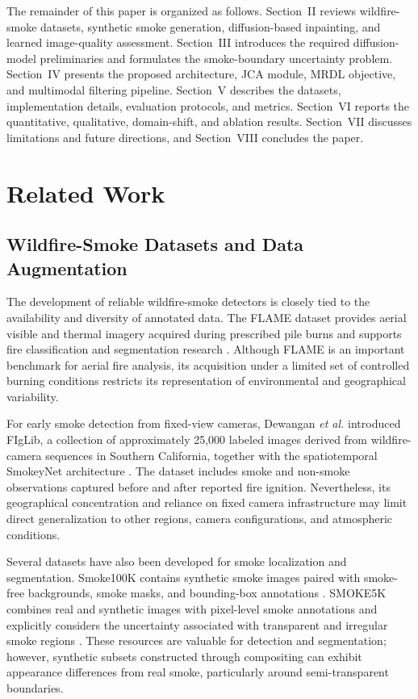 \documentclass[journal]{IEEEtran}
\begin{document}
The remainder of this paper is organized as follows. Section~II reviews
wildfire-smoke datasets, synthetic smoke generation, diffusion-based
inpainting, and learned image-quality assessment. Section~III introduces
the required diffusion-model preliminaries and formulates the
smoke-boundary uncertainty problem. Section~IV presents the proposed
architecture, JCA module, MRDL objective, and multimodal filtering
pipeline. Section~V describes the datasets, implementation details,
evaluation protocols, and metrics. Section~VI reports the quantitative,
qualitative, domain-shift, and ablation results. Section~VII discusses
limitations and future directions, and Section~VIII concludes the
paper.
\section{Related Work}
\label{sec:related}


\subsection{Wildfire-Smoke Datasets and Data Augmentation}
\label{subsec:related_datasets}

The development of reliable wildfire-smoke detectors is closely tied
to the availability and diversity of annotated data. The FLAME dataset
provides aerial visible and thermal imagery acquired during prescribed
pile burns and supports fire classification and segmentation research
\cite{shamsoshoara2020aerialimagerypileburn}. Although FLAME is an
important benchmark for aerial fire analysis, its acquisition under a
limited set of controlled burning conditions restricts its
representation of environmental and geographical variability.

For early smoke detection from fixed-view cameras, Dewangan
\emph{et al.} introduced FIgLib, a collection of approximately 25,000
labeled images derived from wildfire-camera sequences in Southern
California, together with the spatiotemporal SmokeyNet architecture
\cite{Dewangan_2022}. The dataset includes smoke and non-smoke
observations captured before and after reported fire ignition.
Nevertheless, its geographical concentration and reliance on fixed
camera infrastructure may limit direct generalization to other regions,
camera configurations, and atmospheric conditions.

Several datasets have also been developed for smoke localization and
segmentation. Smoke100K contains synthetic smoke images paired with
smoke-free backgrounds, smoke masks, and bounding-box annotations
\cite{cheng_gcce19_smoke100k}. SMOKE5K combines real and synthetic images
with pixel-level smoke annotations and explicitly considers the
uncertainty associated with transparent and irregular smoke regions
\cite{yan2023transmissionguidedbayesiangenerativemodel}. These resources are valuable for detection
and segmentation; however, synthetic subsets constructed through
compositing can exhibit appearance differences from real smoke,
particularly around semi-transparent boundaries.
\end{document}
